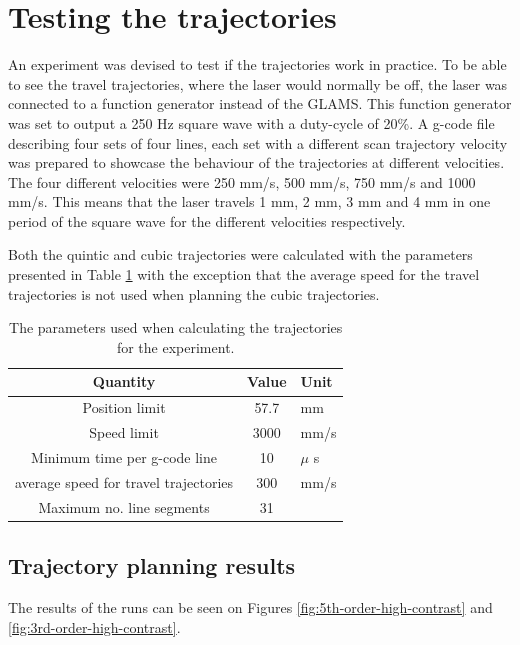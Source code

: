 \section{Testing the trajectories}

An experiment was devised to test if the trajectories work in practice. To be able to see the travel trajectories, where the laser would normally be off, the laser was connected to a function generator instead of the GLAMS. This function generator was set to output a 250 Hz square wave with a duty-cycle of 20\%. A g-code file describing four sets of four lines, each set with a different scan trajectory velocity was prepared to showcase the behaviour of the trajectories at different velocities. The four different velocities were 250 mm/s, 500 mm/s, 750 mm/s and 1000 mm/s. This means that the laser travels 1 mm, 2 mm, 3 mm and 4 mm in one period of the square wave for the different velocities respectively.

Both the quintic and cubic trajectories were calculated with the parameters presented in Table \ref{tab:traj-test-params} with the exception that the average speed for the travel trajectories is not used when planning the cubic trajectories.

\begin{table}[]
    \centering
    \begin{tabular}{c|c|l}
        Quantity & Value & Unit \\ \hline
        Position limit & 57.7 & mm \\
        Speed limit & 3000 & mm/s \\
        Minimum time per g-code line & 10 & $\mu$ s \\
        average speed for travel trajectories & 300 & mm/s \\
        Maximum no. line segments & 31 & \\
    \end{tabular}
    \caption{The parameters used when calculating the trajectories for the experiment.}
    \label{tab:traj-test-params}
\end{table}

\subsection{Trajectory planning results}

The results of the runs can be seen on Figures \ref{fig:5th-order-high-contrast} and \ref{fig:3rd-order-high-contrast}.

